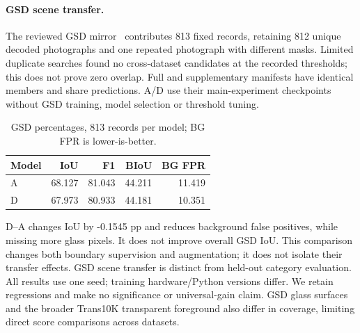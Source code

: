 \paragraph{GSD scene transfer.}
The reviewed GSD mirror~\cite{lin2021glass} contributes 813 fixed records, retaining
812 unique decoded photographs and one repeated photograph with different masks.
Limited duplicate searches found no cross-dataset candidates at the recorded
thresholds; this does not prove zero overlap. Full and supplementary manifests
have identical members and share predictions. A/D use their main-experiment
checkpoints without GSD training, model selection or threshold tuning.
\begin{table}[t]
\centering\small\setlength{\tabcolsep}{4pt}
\begin{tabular}{lrrrr}
\toprule
Model & IoU & F1 & BIoU & BG FPR\\
\midrule
A & 68.127 & 81.043 & 44.211 & 11.419 \\
D & 67.973 & 80.933 & 44.181 & 10.351 \\
\bottomrule
\end{tabular}
\caption{GSD percentages, 813 records per model; BG FPR is lower-is-better.}
\label{tab:m4-final-gsd}
\end{table}
D--A changes IoU by -0.1545 pp and reduces background false positives,
while missing more glass pixels. It does not improve overall GSD IoU. This
comparison changes both boundary supervision and augmentation; it does not
isolate their transfer effects. GSD scene transfer is distinct from held-out
category evaluation. All results use one seed; training hardware/Python versions
differ. We retain regressions and make no significance or universal-gain claim.
GSD glass surfaces and the broader Trans10K transparent foreground also differ
in coverage, limiting direct score comparisons across datasets.
